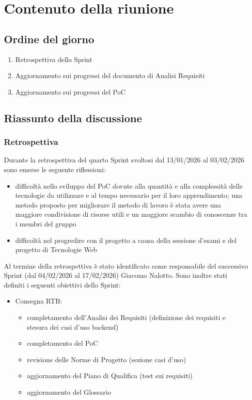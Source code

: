 \documentclass[a4paper, 11pt]{article}
\begin{document}
\section{Contenuto della riunione}

\subsection{Ordine del giorno}
\begin{enumerate}
    \item Retrospettiva dello Sprint
    \item Aggiornamento sui progressi del documento di Analisi Requisiti
    \item Aggiornamento sui progressi del PoC
\end{enumerate}

\subsection{Riassunto della discussione}
\subsubsection{Retrospettiva}
Durante la retrospettiva del quarto Sprint svoltosi dal 13/01/2026 al 03/02/2026 sono emerse le seguente riflessioni:
\begin{itemize}
    \item difficoltà nello sviluppo del PoC dovute alla quantità e alla complessità delle tecnologie da utilizzare e al tempo necessario per il loro apprendimento; una metodo proposto per migliorare il metodo di lavoro è stata avere una maggiore condivisione di risorse utili e un maggiore scambio di conoscenze tra i membri del gruppo
    \item difficoltà nel progredire con il progetto a causa della sessione d'esami e del progetto di Tecnologie Web
\end{itemize}
Al termine della retrospettiva è stato identificato come responsabile del successivo Sprint (dal 04/02/2026 al 17/02/2026) Giacomo Nalotto. Sono inoltre stati definiti i seguenti obiettivi dello Sprint:
\begin{itemize}
    \item Consegna RTB:
    \begin{itemize}
        \item completamento dell'Analisi dei Requisiti (definizione dei requisiti e stesura dei casi d'uso backend)
        \item completamento del PoC
        \item revisione delle Norme di Progetto (sezione casi d'uso)
        \item aggiornamento del Piano di Qualifica (test sui requisiti)
        \item aggiornamento del Glossario
    \end{itemize}
\end{itemize}
\end{document}

